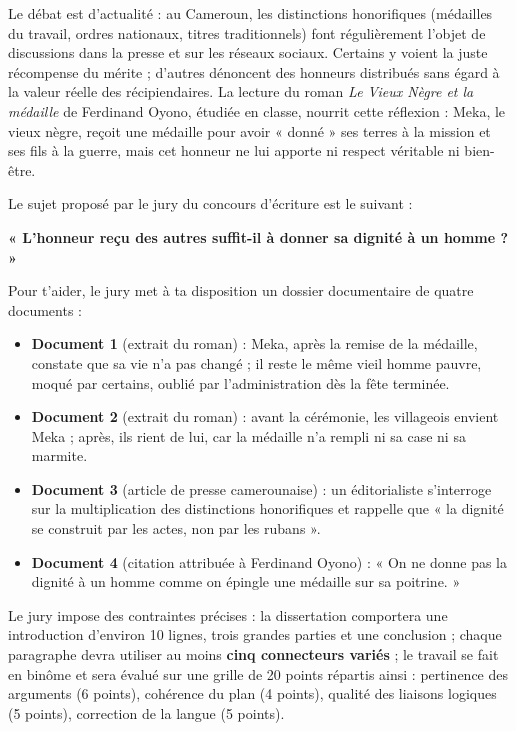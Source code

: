 \documentclass[11pt]{article}
\begin{document}
Le débat est d'actualité : au Cameroun, les distinctions honorifiques (médailles du travail, ordres nationaux, titres traditionnels) font régulièrement l'objet de discussions dans la presse et sur les réseaux sociaux. Certains y voient la juste récompense du mérite ; d'autres dénoncent des honneurs distribués sans égard à la valeur réelle des récipiendaires. La lecture du roman \emph{Le Vieux Nègre et la médaille} de Ferdinand Oyono, étudiée en classe, nourrit cette réflexion : Meka, le vieux nègre, reçoit une médaille pour avoir « donné » ses terres à la mission et ses fils à la guerre, mais cet honneur ne lui apporte ni respect véritable ni bien-être.

Le sujet proposé par le jury du concours d'écriture est le suivant :

\begin{center}
\textbf{« L'honneur reçu des autres suffit-il à donner sa dignité à un homme ? »}
\end{center}

Pour t'aider, le jury met à ta disposition un dossier documentaire de quatre documents :

\begin{itemize}
\item \textbf{Document 1} (extrait du roman) : Meka, après la remise de la médaille, constate que sa vie n'a pas changé ; il reste le même vieil homme pauvre, moqué par certains, oublié par l'administration dès la fête terminée.
\item \textbf{Document 2} (extrait du roman) : avant la cérémonie, les villageois envient Meka ; après, ils rient de lui, car la médaille n'a rempli ni sa case ni sa marmite.
\item \textbf{Document 3} (article de presse camerounaise) : un éditorialiste s'interroge sur la multiplication des distinctions honorifiques et rappelle que « la dignité se construit par les actes, non par les rubans ».
\item \textbf{Document 4} (citation attribuée à Ferdinand Oyono) : « On ne donne pas la dignité à un homme comme on épingle une médaille sur sa poitrine. »
\end{itemize}

Le jury impose des contraintes précises : la dissertation comportera une introduction d'environ 10 lignes, trois grandes parties et une conclusion ; chaque paragraphe devra utiliser au moins \textbf{cinq connecteurs variés} ; le travail se fait en binôme et sera évalué sur une grille de 20 points répartis ainsi : pertinence des arguments (6 points), cohérence du plan (4 points), qualité des liaisons logiques (5 points), correction de la langue (5 points).
\end{document}
